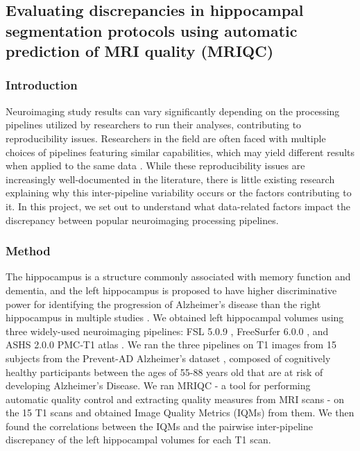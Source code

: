 \documentclass[../main.tex]{subfiles}
\begin{document}
\subsection{Evaluating discrepancies in hippocampal segmentation protocols using automatic prediction of MRI quality (MRIQC)}


\subsubsection{Introduction}

Neuroimaging study results can vary significantly depending on the processing pipelines utilized by researchers to run their analyses, contributing to reproducibility issues. Researchers in the field are often faced with multiple choices of pipelines featuring similar capabilities, which may yield different results when applied to the same data \parencite{carp2012plurality, kennedy2019everything}. While these reproducibility issues are increasingly well-documented in the literature, there is little existing research explaining why this inter-pipeline variability occurs or the factors contributing to it. In this project, we set out to understand what data-related factors impact the discrepancy between popular neuroimaging processing pipelines.

\subsubsection{Method}

The hippocampus is a structure commonly associated with memory function and dementia, and the left hippocampus is proposed to have higher discriminative power for identifying the progression of Alzheimer’s disease than the right hippocampus in multiple studies \parencite{schuff2009mri}. We obtained left hippocampal volumes using three widely-used neuroimaging pipelines: FSL 5.0.9 \parencite{patenaude2011bayesian}, FreeSurfer 6.0.0 \parencite{fischl2012freesurfer}, and ASHS 2.0.0 PMC‐T1 atlas \parencite{xie2019automated}.
We ran the three pipelines on T1 images from 15 subjects from the Prevent-AD Alzheimer’s dataset \parencite{tremblay2021open}, composed of cognitively healthy participants between the ages of 55-88 years old that are at risk of developing Alzheimer's Disease. 
We ran MRIQC \parencite{esteban2017mriqc} - a tool for performing automatic quality control and extracting quality measures from MRI scans - on the 15 T1 scans and obtained Image Quality Metrics (IQMs) from them. We then found the correlations between the IQMs and the pairwise inter-pipeline discrepancy of the left hippocampal volumes for each T1 scan.
\end{document}
